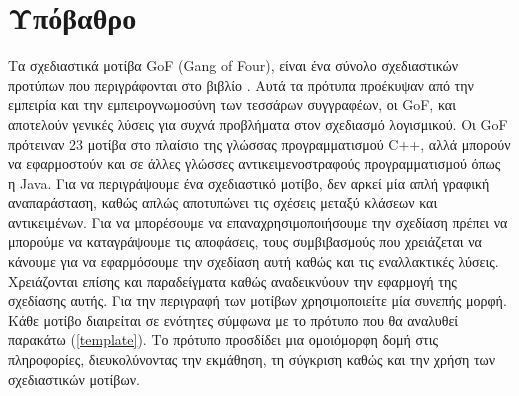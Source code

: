 \section{Υπόβαθρο}
\label{sec:background}
Τα σχεδιαστικά μοτίβα GoF (Gang of Four), είναι ένα σύνολο σχεδιαστικών προτύπων που περιγράφονται στο βιβλίο \cite{GoF}.
Αυτά τα πρότυπα προέκυψαν από την εμπειρία και την εμπειρογνωμοσύνη των τεσσάρων συγγραφέων, οι GoF, και αποτελούν γενικές λύσεις 
για συχνά προβλήματα στον σχεδιασμό λογισμικού. Οι GoF πρότειναν 23 μοτίβα στο πλαίσιο της γλώσσας προγραμματισμού C++, αλλά μπορούν 
να εφαρμοστούν και σε άλλες γλώσσες αντικειμενοστραφούς προγραμματισμού όπως η Java. Για να περιγράψουμε ένα σχεδιαστικό μοτίβο, δεν αρκεί μία
απλή γραφική αναπαράσταση, καθώς απλώς αποτυπώνει τις σχέσεις μεταξύ κλάσεων και αντικειμένων. Για να μπορέσουμε να επαναχρησιμοποιήσουμε την σχεδίαση
πρέπει να μπορούμε να καταγράψουμε τις αποφάσεις, τους συμβιβασμούς που χρειάζεται να κάνουμε για να εφαρμόσουμε την σχεδίαση αυτή 
καθώς και τις εναλλακτικές λύσεις. Χρειάζονται επίσης και παραδείγματα καθώς αναδεικνύουν την εφαρμογή της σχεδίασης αυτής. 
Για την περιγραφή των μοτίβων χρησιμοποιείτε μία συνεπής μορφή. Κάθε μοτίβο διαιρείται σε ενότητες σύμφωνα με το πρότυπο που θα αναλυθεί παρακάτω (\ref{template}). 
Το πρότυπο προσδίδει μια ομοιόμορφη δομή στις πληροφορίες, διευκολύνοντας την εκμάθηση, τη σύγκριση καθώς και την χρήση των σχεδιαστικών μοτίβων.
